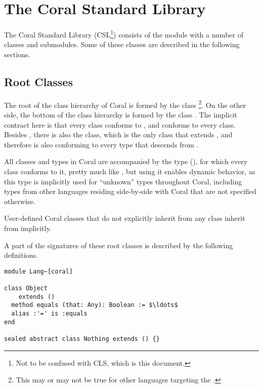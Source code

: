 

\chapter{The Coral Standard Library}

The Coral Standard Library (CSL\footnote{Not to be confused with CLS, which is this document.}) consists of the module  with a number of classes and submodules. Some of these classes are described in the following sections. 

\section{Root Classes}
\label{sec:root-classes}

The root of the class hierarchy of Coral is formed by the class \footnote{This may or may not be true for other languages targeting the .}. On the other side, the bottom of the class hierarchy is formed by the class . The implicit contract here is that every class conforms to , and  conforms to every class. Besides , there is also the  class, which is the only class that extends , and therefore is also conforming to every type that descends from . 

All classes and types in Coral are accompanied by the  type (), for which every class conforms to it, pretty much like , but using it enables dynamic behavior, as this type is implicitly used for ``unknown'' types throughout Coral, including types from other languages residing side-by-side with Coral that are not specified otherwise. 

User-defined Coral classes that do not explicitly inherit from any class inherit from  implicitly. 

A part of the signatures of these root classes is described by the following definitions. 

\begin{lstlisting}
module Lang~[coral]

class Object 
    extends ()
  method equals (that: Any): Boolean := $\ldots$
  alias :'=' is :equals
end

sealed abstract class Nothing extends () {}
\end{lstlisting}






